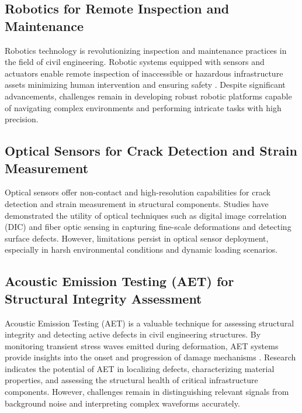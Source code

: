 \documentclass[journal, a4paper]{IEEEtran}
\begin{document}
\subsection{Robotics for Remote Inspection and Maintenance}
Robotics technology is revolutionizing inspection and maintenance practices in the field of civil engineering.
Robotic systems equipped with sensors and actuators enable remote inspection of inaccessible or hazardous infrastructure assets
 minimizing human intervention and ensuring safety 
 \cite{moradi_intelligent_2023} \cite{zhang_structural_2021} \cite{yifei_structure_2023}. Despite significant advancements,
 challenges remain in developing robust robotic platforms capable of navigating complex environments
 and performing intricate tasks with high precision.

\subsection{Optical Sensors for Crack Detection and Strain Measurement}
Optical sensors offer non-contact and high-resolution capabilities for crack detection and strain measurement
in structural components.
Studies \cite{ziaja_shm_2021} \cite{sanchez-romate_structural_2021} \cite{tang_explainable_2023} have demonstrated the utility of optical techniques such as
digital image correlation (DIC) and fiber optic sensing in capturing fine-scale deformations and detecting surface defects.
However, limitations persist in optical sensor deployment, especially in harsh environmental conditions and dynamic loading
scenarios. 

\subsection{Acoustic Emission Testing (AET) for Structural Integrity Assessment}
Acoustic Emission Testing (AET) is a valuable technique for assessing structural integrity and detecting active defects
in civil engineering structures. By monitoring transient stress waves emitted during deformation, AET systems provide
insights into the onset and progression of damage mechanisms
\cite{katunin_modeling_2021} \cite{zhang_spatial_2023} \cite{li_physics-informed_2023}. Research indicates the potential of AET
in localizing defects, characterizing material properties, and assessing the structural health of critical infrastructure
components. However, challenges remain in distinguishing relevant signals from background noise and interpreting complex
waveforms accurately.
\end{document}
